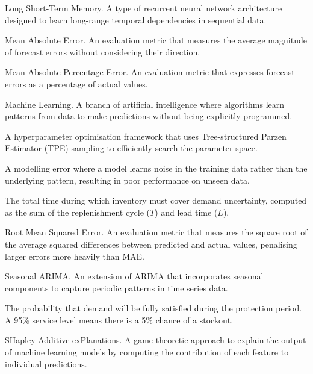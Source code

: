 \documentclass[ENG]{TFUOC}%
\begin{document}
\begin{description}[style=nextline, leftmargin=3.5cm, labelwidth=3.2cm]
\item[LSTM] Long Short-Term Memory. A type of recurrent neural network architecture designed to learn long-range temporal dependencies in sequential data.

\item[MAE] Mean Absolute Error. An evaluation metric that measures the average magnitude of forecast errors without considering their direction.

\item[MAPE] Mean Absolute Percentage Error. An evaluation metric that expresses forecast errors as a percentage of actual values.

\item[ML] Machine Learning. A branch of artificial intelligence where algorithms learn patterns from data to make predictions without being explicitly programmed.

\item[Optuna] A hyperparameter optimisation framework that uses Tree-structured Parzen Estimator (TPE) sampling to efficiently search the parameter space.

\item[Overfitting] A modelling error where a model learns noise in the training data rather than the underlying pattern, resulting in poor performance on unseen data.

\item[Protection period] The total time during which inventory must cover demand uncertainty, computed as the sum of the replenishment cycle ($T$) and lead time ($L$).

\item[RMSE] Root Mean Squared Error. An evaluation metric that measures the square root of the average squared differences between predicted and actual values, penalising larger errors more heavily than MAE.

\item[SARIMA] Seasonal ARIMA. An extension of ARIMA that incorporates seasonal components to capture periodic patterns in time series data.

\item[Service level] The probability that demand will be fully satisfied during the protection period. A 95\% service level means there is a 5\% chance of a stockout.

\item[SHAP] SHapley Additive exPlanations. A game-theoretic approach to explain the output of machine learning models by computing the contribution of each feature to individual predictions.


\end{description}
\end{document}
